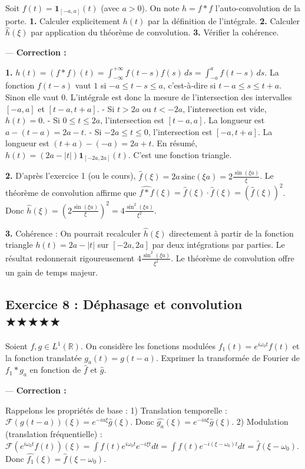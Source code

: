 \documentclass[11pt,a4paper]{article}
\begin{document}
Soit $f(t) = \mathbf{1}_{[-a, a]}(t)$ (avec $a > 0$).
On note $h = f * f$ l'auto-convolution de la porte.
\textbf{1.} Calculer explicitement $h(t)$ par la définition de l'intégrale.
\textbf{2.} Calculer $\hat{h}(\xi)$ par application du théorème de convolution.
\textbf{3.} Vérifier la cohérence.

---
\textbf{Correction :}

\textbf{1.} $h(t) = (f * f)(t) = \int_{-\infty}^{+\infty} f(t-s)f(s) \, ds = \int_{-a}^{a} f(t-s) \, ds$.
La fonction $f(t-s)$ vaut $1$ si $-a \le t-s \le a$, c'est-à-dire si $t-a \le s \le t+a$. Sinon elle vaut $0$.
L'intégrale est donc la mesure de l'intersection des intervalles $[-a, a]$ et $[t-a, t+a]$.
- Si $t > 2a$ ou $t < -2a$, l'intersection est vide, $h(t) = 0$.
- Si $0 \le t \le 2a$, l'intersection est $[t-a, a]$. La longueur est $a - (t-a) = 2a - t$.
- Si $-2a \le t \le 0$, l'intersection est $[-a, t+a]$. La longueur est $(t+a) - (-a) = 2a + t$.
En résumé, $h(t) = (2a - |t|) \mathbf{1}_{[-2a, 2a]}(t)$. C'est une fonction triangle.

\textbf{2.} D'après l'exercice 1 (ou le cours), $\hat{f}(\xi) = 2a \, \text{sinc}(\xi a) = 2 \frac{\sin(\xi a)}{\xi}$.
Le théorème de convolution affirme que $\widehat{f * f}(\xi) = \hat{f}(\xi) \cdot \hat{f}(\xi) = (\hat{f}(\xi))^2$.
Donc $\hat{h}(\xi) = \left( 2 \frac{\sin(\xi a)}{\xi} \right)^2 = 4 \frac{\sin^2(\xi a)}{\xi^2}$.

\textbf{3.} Cohérence :
On pourrait recalculer $\hat{h}(\xi)$ directement à partir de la fonction triangle $h(t) = 2a - |t|$ sur $[-2a, 2a]$ par deux intégrations par parties. Le résultat redonnerait rigoureusement $4 \frac{\sin^2(\xi a)}{\xi^2}$. Le théorème de convolution offre un gain de temps majeur.


\subsection*{Exercice 8 : Déphasage et convolution \quad $\bigstar\bigstar\bigstar\bigstar\bigstar$}

Soient $f, g \in L^1(\mathbb{R})$.
On considère les fonctions modulées $f_1(t) = e^{i\omega_0 t} f(t)$ et la fonction translatée $g_a(t) = g(t-a)$.
Exprimer la transformée de Fourier de $f_1 * g_a$ en fonction de $\hat{f}$ et $\hat{g}$.

---
\textbf{Correction :}

Rappelons les propriétés de base :
1) Translation temporelle : $\mathcal{F}(g(t-a))(\xi) = e^{-ia\xi} \hat{g}(\xi)$. Donc $\widehat{g_a}(\xi) = e^{-ia\xi} \hat{g}(\xi)$.
2) Modulation (translation fréquentielle) :
$\mathcal{F}(e^{i\omega_0 t} f(t))(\xi) = \int f(t) e^{i\omega_0 t} e^{-i\xi t} dt = \int f(t) e^{-i(\xi - \omega_0) t} dt = \hat{f}(\xi - \omega_0)$.
Donc $\widehat{f_1}(\xi) = \hat{f}(\xi - \omega_0)$.
\end{document}
